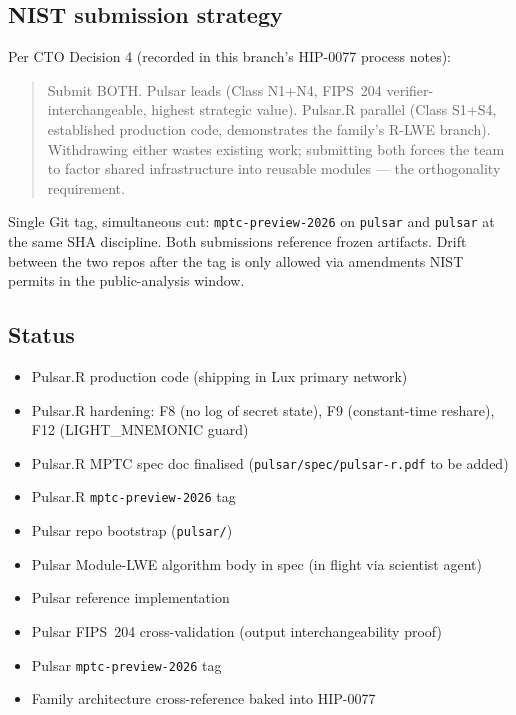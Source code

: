\subsection{NIST submission strategy}

Per CTO Decision 4 (recorded in this branch's HIP-0077 process
notes):

\begin{quote}
Submit BOTH. Pulsar leads (Class N1+N4, FIPS~204
verifier-interchangeable, highest strategic value). Pulsar.R parallel
(Class S1+S4, established production code, demonstrates the family's
R-LWE branch). Withdrawing either wastes existing work; submitting
both forces the team to factor shared infrastructure into reusable
modules --- the orthogonality requirement.
\end{quote}

Single Git tag, simultaneous cut: \texttt{mptc-preview-2026} on
\texttt{pulsar} and \texttt{pulsar} at the same SHA discipline.
Both submissions reference frozen artifacts. Drift between the two
repos after the tag is only allowed via amendments NIST permits in
the public-analysis window.

\subsection{Status}

\begin{itemize}[leftmargin=*, itemsep=0pt]
\item[$\boxtimes$] Pulsar.R production code (shipping in Lux primary
network)
\item[$\boxtimes$] Pulsar.R hardening: F8 (no log of secret state),
F9 (constant-time reshare), F12 (LIGHT\_MNEMONIC guard)
\item[$\square$] Pulsar.R MPTC spec doc finalised
(\texttt{pulsar/spec/pulsar-r.pdf} to be added)
\item[$\square$] Pulsar.R \texttt{mptc-preview-2026} tag
\item[$\boxtimes$] Pulsar repo bootstrap (\texttt{pulsar/})
\item[$\square$] Pulsar Module-LWE algorithm body in spec (in
flight via scientist agent)
\item[$\square$] Pulsar reference implementation
\item[$\square$] Pulsar FIPS~204 cross-validation (output
interchangeability proof)
\item[$\square$] Pulsar \texttt{mptc-preview-2026} tag
\item[$\square$] Family architecture cross-reference baked into
HIP-0077
\end{itemize}

